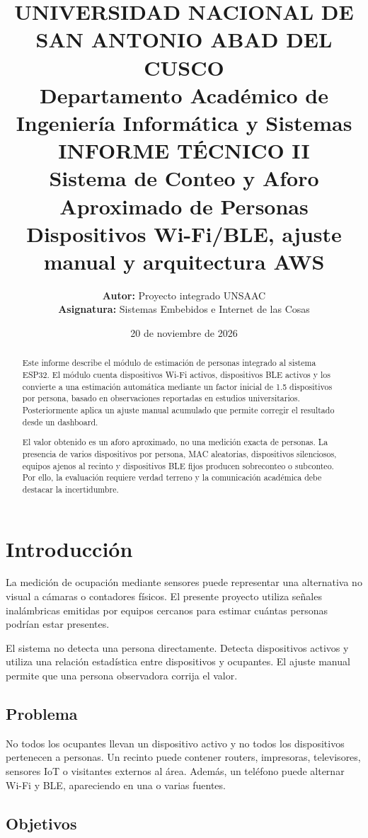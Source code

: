 \documentclass[12pt,a4paper]{article}
\title{\textbf{\Large UNIVERSIDAD NACIONAL DE SAN ANTONIO ABAD DEL CUSCO}\\[0.3cm]
\large Departamento Académico de Ingeniería Informática y Sistemas\\[1.2cm]
\textbf{\LARGE INFORME TÉCNICO II}\\[0.25cm]
\textbf{\Large Sistema de Conteo y Aforo Aproximado de Personas}\\[0.25cm]
\large Dispositivos Wi-Fi/BLE, ajuste manual y arquitectura AWS}
\author{\textbf{Autor:} Proyecto integrado UNSAAC\\
\textbf{Asignatura:} Sistemas Embebidos e Internet de las Cosas}
\date{20 de noviembre de 2026}
\begin{document}
\maketitle
\thispagestyle{empty}
\begin{abstract}
Este informe describe el módulo de estimación de personas integrado al sistema ESP32. El módulo cuenta dispositivos Wi-Fi activos, dispositivos BLE activos y los convierte a una estimación automática mediante un factor inicial de 1.5 dispositivos por persona, basado en observaciones reportadas en estudios universitarios. Posteriormente aplica un ajuste manual acumulado que permite corregir el resultado desde un dashboard.

El valor obtenido es un aforo aproximado, no una medición exacta de personas. La presencia de varios dispositivos por persona, MAC aleatorias, dispositivos silenciosos, equipos ajenos al recinto y dispositivos BLE fijos producen sobreconteo o subconteo. Por ello, la evaluación requiere verdad terreno y la comunicación académica debe destacar la incertidumbre.
\end{abstract}
\clearpage
{}
\tableofcontents
\clearpage
{}
\listoftables
\clearpage

\section{Introducción}
La medición de ocupación mediante sensores puede representar una alternativa no visual a cámaras o contadores físicos. El presente proyecto utiliza señales inalámbricas emitidas por equipos cercanos para estimar cuántas personas podrían estar presentes.

El sistema no detecta una persona directamente. Detecta dispositivos activos y utiliza una relación estadística entre dispositivos y ocupantes. El ajuste manual permite que una persona observadora corrija el valor.

\subsection{Problema}
No todos los ocupantes llevan un dispositivo activo y no todos los dispositivos pertenecen a personas. Un recinto puede contener routers, impresoras, televisores, sensores IoT o visitantes externos al área. Además, un teléfono puede alternar Wi-Fi y BLE, apareciendo en una o varias fuentes.

\subsection{Objetivos}
\end{document}
